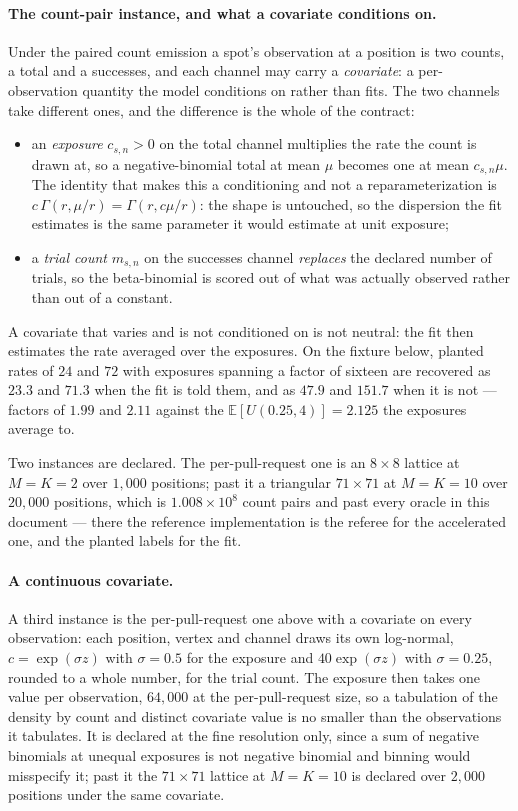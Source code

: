 \documentclass[11pt,a4paper]{article}
\begin{document}
\paragraph{The count-pair instance, and what a covariate conditions on.}
\label{par:coupled:pairs}
Under the paired count emission a spot's observation at a position is two
counts, a total and a successes, and each channel may carry a
\emph{covariate}: a per-observation quantity the model conditions on rather
than fits. The two channels take different ones, and the difference is the
whole of the contract:
\begin{itemize}
  \item an \emph{exposure} $c_{s,n} > 0$ on the total channel multiplies the
    rate the count is drawn at, so a negative-binomial total at mean $\mu$
    becomes one at mean $c_{s,n}\mu$. The identity that makes this a
    conditioning and not a reparameterization is
    $c\,\Gamma(r, \mu/r) = \Gamma(r, c\mu/r)$: the shape is untouched, so the
    dispersion the fit estimates is the same parameter it would estimate at
    unit exposure;
  \item a \emph{trial count} $m_{s,n}$ on the successes channel
    \emph{replaces} the declared number of trials, so the beta-binomial is
    scored out of what was actually observed rather than out of a constant.
\end{itemize}
A covariate that varies and is not conditioned on is not neutral: the fit then
estimates the rate averaged over the exposures. On the fixture below, planted
rates of $24$ and $72$ with exposures spanning a factor of sixteen are
recovered as $23.3$ and $71.3$ when the fit is told them, and as $47.9$ and
$151.7$ when it is not --- factors of $1.99$ and $2.11$ against the
$\mathbb{E}[U(0.25, 4)] = 2.125$ the exposures average to.

Two instances are declared. The per-pull-request one is an $8 \times 8$
lattice at $M = K = 2$ over $1{,}000$ positions; past it a triangular
$71 \times 71$ at $M = K = 10$ over $20{,}000$ positions, which is
$1.008 \times 10^{8}$ count pairs and past every oracle in this document ---
there the reference implementation is the referee for the accelerated one, and
the planted labels for the fit.

\paragraph{A continuous covariate.}
\label{par:coupled:covariate}
A third instance is the per-pull-request one above with a covariate on every
observation: each position, vertex and channel draws its own log-normal,
$c = \exp(\sigma z)$ with $\sigma = 0.5$ for the exposure and $40 \exp(\sigma
z)$ with $\sigma = 0.25$, rounded to a whole number, for the trial count. The
exposure then takes one value per observation, $64{,}000$ at the
per-pull-request size, so a tabulation of the density by count and distinct
covariate value is no smaller than the observations it tabulates. It is
declared at the fine resolution only, since a sum of negative binomials at
unequal exposures is not negative binomial and binning would misspecify it;
past it the $71 \times 71$ lattice at $M = K = 10$ is declared over $2{,}000$
positions under the same covariate.
\end{document}
